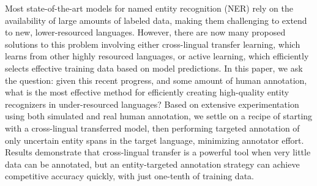 Most state-of-the-art models for named entity recognition (NER) rely on the availability of large amounts of labeled data, making them challenging to extend to new, lower-resourced languages. However, there are now many proposed solutions to this problem involving either cross-lingual transfer learning, which learns from other highly resourced languages, or active learning, which efficiently selects effective training data based on model predictions. In this paper, we ask the question: given this recent progress, and some amount of human annotation, what is the most effective method for efficiently creating high-quality entity recognizers in under-resourced languages? Based on extensive experimentation using both simulated and real human annotation, we settle on a recipe of starting with a cross-lingual transferred model, then performing targeted annotation of only uncertain entity spans in the target language, minimizing annotator effort.
Results demonstrate that cross-lingual transfer is a powerful tool when very little data can be annotated, but an entity-targeted annotation strategy can achieve competitive accuracy quickly, with just one-tenth of training data.